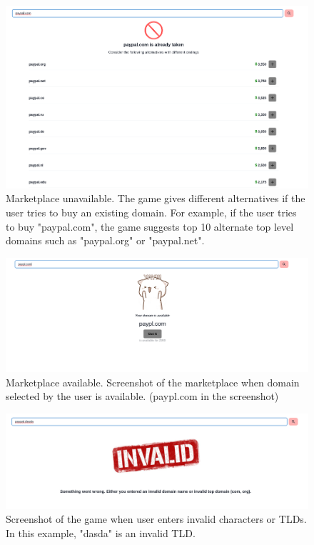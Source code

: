 \begin{figure}[!ht]
    \centering
    \includegraphics[width=\textwidth]{figures/section2/marketplace_unavailable.png}
    \caption[Marketplace unavailable]{Marketplace unavailable. The game gives different alternatives if the user tries to buy an existing domain. For example, if the user tries to buy "paypal.com", the game suggests top 10 alternate top level domains such as "paypal.org" or "paypal.net".}
    \label{subfig:marketplace-unavailable}
\end{figure}

\begin{figure}[!ht]
    \centering
    \includegraphics[width=\textwidth]{figures/section2/marketplace_available.png}
    \caption[Marketplace available]{Marketplace available. Screenshot of the marketplace when domain selected by the user is available. (paypl.com in the screenshot) }
    \label{subfig:marketplace-available}
\end{figure}


\begin{figure}[!ht]
    \centering
    \includegraphics[width=\textwidth]{figures/section2/marketplace_invalid.png}
    \caption[Marketplace available]{Screenshot of the game when user enters invalid characters or TLDs. In this example, "dasda" is an invalid TLD.}
    \label{subfig:marketplace-invalid}
\end{figure}


